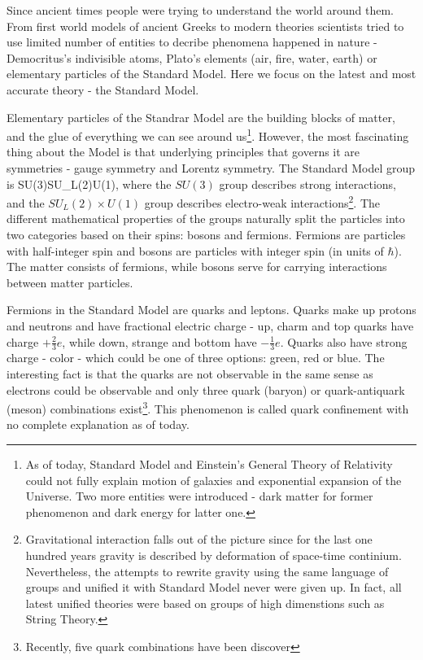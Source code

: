 Since ancient times people were trying to understand the world around them. From 
first world models of ancient Greeks to modern theories scientists tried to use 
limited number of entities to decribe phenomena happened in nature - Democritus's 
indivisible atoms, Plato's elements (air, fire, water, earth) or elementary particles 
of the Standard Model. Here we focus on the latest and most accurate theory - the
Standard Model.

Elementary particles of the Standrar Model are the building blocks of matter, and the glue of everything we
can see around us\footnote{As of today, Standard Model and Einstein's General Theory of 
Relativity could not fully explain motion of galaxies and exponential expansion of the Universe. 
Two more entities were introduced - dark matter for former phenomenon and dark energy 
for latter one.}. However, the most fascinating thing about the Model is that underlying 
principles that governs it are symmetries - gauge symmetry and Lorentz 
symmetry. The Standard Model group is 
\be
SU(3)\times SU_L(2)\times U(1),
\ee 
where the $SU(3)$ group describes strong interactions, and the $SU_L(2)\times U(1)$ group describes 
electro-weak interactions\footnote{Gravitational interaction falls out of the picture
since for the last one hundred years gravity is described by deformation of space-time 
continium. Nevertheless, the attempts to rewrite gravity using the same language of groups
and unified it with Standard Model never were given up. In fact, all latest unified theories 
were based on groups of high dimenstions such as
String Theory.}. The different mathematical properties of the groups naturally split
the particles into two categories based on their spins: bosons and fermions. Fermions are 
particles with half-integer spin and bosons are particles with integer spin (in units of $\hbar$). 
The matter consists of fermions, while bosons serve for carrying interactions between matter particles.

Fermions in the Standard Model are quarks and leptons. Quarks make up protons
and neutrons and have fractional electric charge - up, charm and top quarks have charge $+\frac{2}{3}e$, 
while down, strange and bottom have $-\frac{1}{3}e$. Quarks also have strong charge - color -
which could be one of three options: green, red or blue. The interesting fact is that the quarks
are not observable in the same sense as electrons could be observable and only three quark (baryon) or 
quark-antiquark (meson) combinations exist\footnote{Recently, five quark combinations have been discover}. 
This phenomenon is called quark confinement with no complete explanation as of today. 

